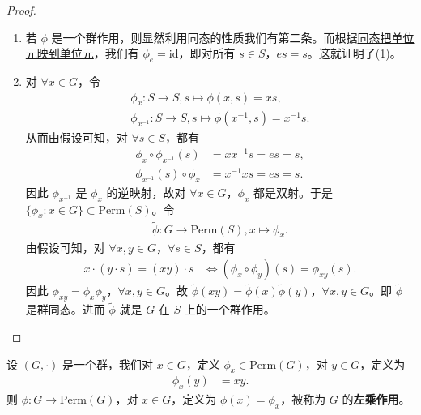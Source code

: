 \documentclass[../../main.tex]{subfiles}
\begin{document}
\begin{proof}
\begin{enumerate}[(1)]
\item 若 \(\phi\) 是一个群作用，则显然利用同态的性质我们有第二条。而根据\hyperref[proposition:群同态保持逆元和单位元]{同态把单位元映到单位元}，我们有 \(\phi_e = \mathrm{id}\)，即对所有 \(s \in S\)，\(es = s\)。这就证明了(1)。

\item 对 \(\forall x \in G\)，令
\begin{gather*}
\phi_x: S \to S,  s \mapsto \phi(x, s) = xs,\\
\phi_{x^{-1}}: S \to S,  s \mapsto \phi(x^{-1}, s) = x^{-1}s.
\end{gather*}
从而由假设可知，对 \(\forall s \in S\)，都有
\begin{align*}
\phi_x \circ \phi_{x^{-1}}(s) &= xx^{-1}s = es = s,\\
\phi_{x^{-1}}(s) \circ \phi_x &= x^{-1}xs = es = s.
\end{align*}
因此 \(\phi_{x^{-1}}\) 是 \(\phi_x\) 的逆映射，故对 \(\forall x \in G\)，\(\phi_x\) 都是双射。于是 \(\{\phi_x : x \in G\} \subset \mathrm{Perm}(S)\)。令
\begin{gather*}
\widetilde{\phi}: G \to \mathrm{Perm}(S), x \mapsto \phi_x.
\end{gather*}
由假设可知，对 \(\forall x, y \in G\)，\(\forall s \in S\)，都有
\begin{align*}
x \cdot (y \cdot s) = (xy) \cdot s &\Leftrightarrow (\phi_x \circ \phi_y)(s) = \phi_{xy}(s).
\end{align*}
因此 \(\phi_{xy} = \phi_x\phi_y\)，\(\forall x, y \in G\)。故 \(\widetilde{\phi}(xy) = \widetilde{\phi}(x)\widetilde{\phi}(y)\)，\(\forall x, y \in G\)。即 \(\widetilde{\phi}\) 是群同态。进而 \(\widetilde{\phi}\) 就是 \(G\) 在 \(S\) 上的一个群作用。 
\end{enumerate}
\end{proof}

\begin{definition}[左乘作用]
设 \((G, \cdot)\) 是一个群，我们对 \(x \in G\)，定义 \(\phi_x \in \mathrm{Perm}(G)\)，对 \(y \in G\)，定义为
\begin{align*}
\phi_x(y) &= xy.
\end{align*}
则 \(\phi: G \to \mathrm{Perm}(G)\)，对 \(x \in G\)，定义为 \(\phi(x) = \phi_x\)，被称为 \(G\) 的\textbf{左乘作用}。 
\end{definition}
\end{document}
